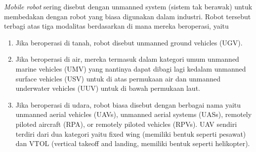 \textit{Mobile robot} sering disebut dengan unmanned system (sistem tak berawak) untuk membedakan dengan robot yang biasa digunakan dalam industri. Robot tersebut terbagi atas tiga modalitas berdasarkan di mana mereka beroperasi, yaitu
\begin{enumerate}
 \item Jika beroperasi di tanah, robot disebut unmanned ground vehicles (UGV).
 \item Jika beroperasi di air, mereka termasuk dalam kategori umum unmanned marine vehicles (UMV) yang nantinya dapat dibagi lagi kedalam unmanned surface vehicles (USV) untuk di atas permukaan air dan unmanned underwater vehicles (UUV) untuk di bawah permukaan laut.
 \item Jika beroperasi di udara, robot biasa disebut dengan berbagai nama yaitu unmanned aerial vehicles (UAVs), unmanned aerial systems (UASs), remotely piloted aircraft (RPA), or remotely piloted vehicles (RPVs). UAV sendiri terdiri dari dua kategori yaitu fixed wing (memiliki bentuk seperti pesawat) dan VTOL (vertical takeoff and landing, memiliki bentuk seperti helikopter).
\end{enumerate}

